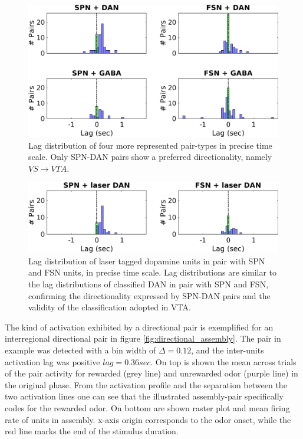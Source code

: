 \begin{figure}[H]
\centering
\includegraphics[scale=0.48]{figures/LagSec4Typo3VS.png}
\caption{Lag distribution of four more represented pair-types in precise time scale. Only SPN-DAN pairs show a preferred directionality, namely $VS\rightarrow VTA$.}
\label{fig:LagInSec4typo}
\end{figure}
\begin{figure}[H]
\centering
\includegraphics[scale=0.48]{figures/LagSecLaser3VS.png}
\caption{Lag distribution of laser tagged dopamine units in pair with SPN and FSN units, in precise time scale. Lag distributions are similar to the lag distributions of classified DAN in pair with SPN and FSN, confirming the directionality expressed by SPN-DAN pairs and the validity of the classification adopted in VTA.}
\label{fig:LagInSecLaser}
\end{figure}
The kind of activation exhibited by a directional pair is exemplified for an interregional directional pair in figure \ref{fig:directional_assembly}. The pair in example was detected with a bin width of $\Delta = 0.12$, and the inter-units activation lag was positive $lag = 0.36 sec$. On top is shown the mean across trials of the pair activity for rewarded (grey line) and unrewarded odor (purple line) in the original phase. From the activation profile and the separation between the two activation lines one can see that the illustrated assembly-pair specifically codes for the rewarded odor. On bottom are shown raster plot and mean firing rate of units in assembly. x-axis origin corresponds to the odor onset, while the red line marks the end of the stimulus duration.\\

